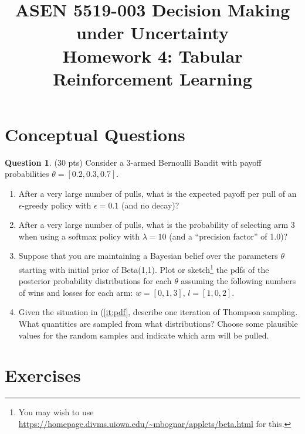 \documentclass{article}
\title{ASEN 5519-003 Decision Making under Uncertainty\\
       Homework 4: Tabular Reinforcement Learning}
\theoremstyle{definition}
\newtheorem{question}[thm]{Question}
\begin{document}
\maketitle

\section{Conceptual Questions}

\begin{question}
    (30 pts) Consider a 3-armed Bernoulli Bandit with payoff probabilities $\theta = [0.2, 0.3, 0.7]$.
    \begin{enumerate}[label=\alph*),noitemsep]
        \item After a very large number of pulls, what is the expected payoff per pull of an $\epsilon$-greedy policy with $\epsilon=0.1$ (and no decay)?
        \item After a very large number of pulls, what is the probability of selecting arm 3 when using a softmax policy with $\lambda=10$ (and a ``precision factor'' of 1.0)?
        \item Suppose that you are maintaining a Bayesian belief over the parameters $\theta$ starting with initial prior of Beta(1,1). Plot or sketch\footnote{You may wish to use \url{https://homepage.divms.uiowa.edu/~mbognar/applets/beta.html} for this.} the pdfs of the posterior probability distributions for each $\theta$ assuming the following numbers of wins and losses for each arm: $w = [0, 1, 3]$, $l = [1, 0, 2]$.\label{it:pdf}
        \item Given the situation in (\ref{it:pdf}, describe one iteration of Thompson sampling. What quantities are sampled from what distributions? Choose some plausible values for the random samples and indicate which arm will be pulled.
    \end{enumerate}
\end{question}

\section{Exercises}
\end{document}
